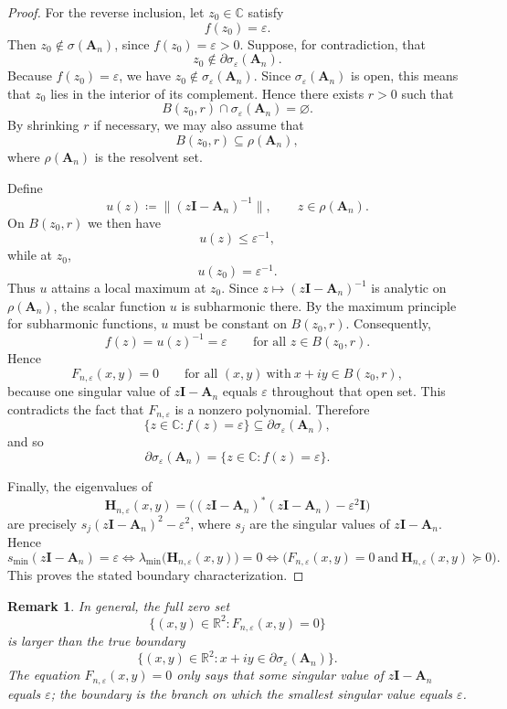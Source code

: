 \documentclass[11pt]{article}
\newtheorem{remark}[theorem]{Remark}
\begin{document}
\begin{proof}
For the reverse inclusion, let $z_0\in\mathbb{C}$ satisfy
\[
f(z_0)=\varepsilon.
\]
Then $z_0\notin \sigma(\mathbf{A}_n)$, since $f(z_0)=\varepsilon>0$.
Suppose, for contradiction, that
\[
z_0\notin \partial\sigma_\varepsilon(\mathbf{A}_n).
\]
Because $f(z_0)=\varepsilon$, we have $z_0\notin \sigma_\varepsilon(\mathbf{A}_n)$.
Since $\sigma_\varepsilon(\mathbf{A}_n)$ is open, this means that $z_0$ lies in the interior of its complement.
Hence there exists $r>0$ such that
\[
B(z_0,r)\cap \sigma_\varepsilon(\mathbf{A}_n)=\varnothing.
\]
By shrinking $r$ if necessary, we may also assume that
\[
B(z_0,r)\subseteq \rho(\mathbf{A}_n),
\]
where $\rho(\mathbf{A}_n)$ is the resolvent set.

Define
\[
u(z)\coloneqq \|(z\mathbf{I}-\mathbf{A}_n)^{-1}\|,
\qquad z\in \rho(\mathbf{A}_n).
\]
On $B(z_0,r)$ we then have
\[
u(z)\le \varepsilon^{-1},
\]
while at $z_0$,
\[
u(z_0)=\varepsilon^{-1}.
\]
Thus $u$ attains a local maximum at $z_0$.
Since $z\mapsto (z\mathbf{I}-\mathbf{A}_n)^{-1}$ is analytic on $\rho(\mathbf{A}_n)$,
the scalar function $u$ is subharmonic there. By the maximum principle for subharmonic functions,
$u$ must be constant on $B(z_0,r)$. Consequently,
\[
f(z)=u(z)^{-1}=\varepsilon
\qquad \text{for all } z\in B(z_0,r).
\]
Hence
\[
F_{n,\varepsilon}(x,y)=0
\qquad \text{for all } (x,y)\ \text{with}\ x+iy\in B(z_0,r),
\]
because one singular value of $z\mathbf{I}-\mathbf{A}_n$ equals $\varepsilon$ throughout that open set.
This contradicts the fact that $F_{n,\varepsilon}$ is a nonzero polynomial.
Therefore
\[
\{z\in\mathbb{C}\colon f(z)=\varepsilon\}\subseteq \partial\sigma_\varepsilon(\mathbf{A}_n),
\]
and so
\[
\partial\sigma_\varepsilon(\mathbf{A}_n)=\{z\in\mathbb{C}\colon f(z)=\varepsilon\}.
\]

Finally, the eigenvalues of
\[
\mathbf{H}_{n,\varepsilon}(x,y)
=\bigl((z\mathbf{I}-\mathbf{A}_n)^*(z\mathbf{I}-\mathbf{A}_n)-\varepsilon^2\mathbf{I}\bigr)
\]
are precisely $s_j(z\mathbf{I}-\mathbf{A}_n)^2-\varepsilon^2$, where $s_j$ are the singular values
of $z\mathbf{I}-\mathbf{A}_n$. Hence
\[
s_{\min}(z\mathbf{I}-\mathbf{A}_n)=\varepsilon
\iff
\lambda_{\min}\bigl(\mathbf{H}_{n,\varepsilon}(x,y)\bigr)=0
\iff
\bigl(F_{n,\varepsilon}(x,y)=0\ \text{and}\ \mathbf{H}_{n,\varepsilon}(x,y)\succeq 0\bigr).
\]
This proves the stated boundary characterization.
\end{proof}

\begin{remark}\label{rem:not-exact-algebraic-curve}
In general, the full zero set
\[
\bigl\{(x,y)\in\mathbb{R}^2\colon F_{n,\varepsilon}(x,y)=0\bigr\}
\]
is larger than the true boundary
\[
\bigl\{(x,y)\in\mathbb{R}^2\colon x+iy\in \partial\sigma_\varepsilon(\mathbf{A}_n)\bigr\}.
\]
The equation $F_{n,\varepsilon}(x,y)=0$ only says that \emph{some} singular value of
$z\mathbf{I}-\mathbf{A}_n$ equals $\varepsilon$; the boundary is the branch on which the
\emph{smallest} singular value equals $\varepsilon$.
\end{remark}
\end{document}
